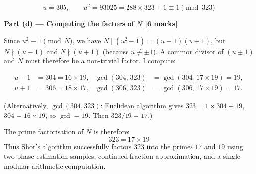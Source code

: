 \documentclass[12pt,a4paper]{article}
\begin{document}
\[
  \boxed{u=305,\qquad u^2 = 93025 = 288\times323+1\equiv1\pmod{323}}
\]

\medskip
\textbf{Part (d) --- Computing the factors of $N$ [6 marks]}

\medskip
Since $u^2\equiv1\pmod{N}$, we have $N\mid(u^2-1)=(u-1)(u+1)$,
but $N\nmid(u-1)$ and $N\nmid(u+1)$ (because $u\not\equiv\pm1$).
A common divisor of $(u\pm1)$ and $N$ must therefore be a non-trivial factor. I compute:

\begin{align*}
u-1 &= 304 = 16\times19, & \gcd(304,\,323) &= \gcd(304,\,17\times19) = 19, \\
u+1 &= 306 = 18\times17, & \gcd(306,\,323) &= \gcd(306,\,17\times19) = 17.
\end{align*}

(Alternatively, $\gcd(304,323)$: Euclidean algorithm gives $323=1\times304+19$, $304=16\times19$,
so $\gcd=19$. Then $323/19=17$.)

The prime factorisation of $N$ is therefore:
\[
  \boxed{323 = 17\times19}
\]
Thus Shor's algorithm successfully factors $323$ into the primes $17$ and $19$ using two phase-estimation
samples, continued-fraction approximation, and a single modular-arithmetic computation.
\end{document}
